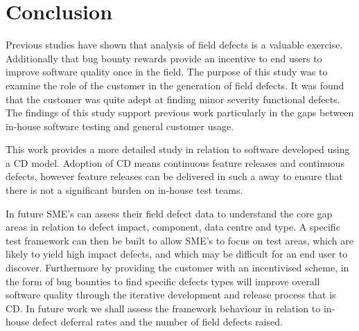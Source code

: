 \documentclass[conference]{IEEEtran}
\begin{document}
\section{Conclusion}
Previous studies have shown that analysis of field defects is a valuable exercise. Additionally that bug bounty rewards provide an incentive to end users to improve software quality once in the field. The purpose of this study was to examine the role of the customer in the generation of field defects. It was found that the customer was quite adept at finding minor severity functional defects.  The findings of this study support previous work particularly in the gaps between in-house software testing and general customer usage. \par
This work provides a more detailed study in relation to software developed using a CD model. Adoption of CD means continuous feature releases and continuous defects, however feature releases can be delivered in such a away to ensure that there is not a significant burden on in-house test teams.  \par
 In future SME's can assess their field defect data to understand the core gap areas in relation to defect impact, component, data centre and type. A specific test framework can then be built to allow SME's to focus on test areas, which are likely to yield high impact defects, and which may be difficult for an end user to discover. 
Furthermore by providing the customer with an incentivised scheme, in the form of bug bounties to find specific defects types will improve overall software quality through the iterative development and release process that is CD. 
In future work we shall assess the framework behaviour in relation to in-house defect deferral rates and the number of field defects raised.
%
%
\end{document}
